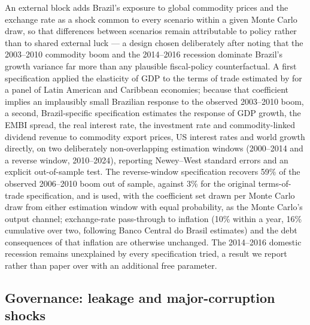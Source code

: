 \documentclass[11pt,a4paper]{article}
\begin{document}
An external block adds Brazil's exposure to global commodity prices and the exchange rate as a shock common to every scenario within a given Monte Carlo draw, so that differences between scenarios remain attributable to policy rather than to shared external luck --- a design chosen deliberately after noting that the 2003--2010 commodity boom and the 2014--2016 recession dominate Brazil's growth variance far more than any plausible fiscal-policy counterfactual. A first specification applied the elasticity of GDP to the terms of trade estimated by \citet{gruss2014} for a panel of Latin American and Caribbean economies; because that coefficient implies an implausibly small Brazilian response to the observed 2003--2010 boom, a second, Brazil-specific specification estimates the response of GDP growth, the EMBI spread, the real interest rate, the investment rate and commodity-linked dividend revenue to commodity export prices, US interest rates and world growth directly, on two deliberately non-overlapping estimation windows (2000--2014 and a reverse window, 2010--2024), reporting Newey--West standard errors and an explicit out-of-sample test. The reverse-window specification recovers 59\% of the observed 2006--2010 boom out of sample, against 3\% for the original terms-of-trade specification, and is used, with the coefficient set drawn per Monte Carlo draw from either estimation window with equal probability, as the Monte Carlo's output channel; exchange-rate pass-through to inflation (10\% within a year, 16\% cumulative over two, following Banco Central do Brasil estimates) and the debt consequences of that inflation are otherwise unchanged. The 2014--2016 domestic recession remains unexplained by every specification tried, a result we report rather than paper over with an additional free parameter.

\subsection{Governance: leakage and major-corruption shocks}
\end{document}
